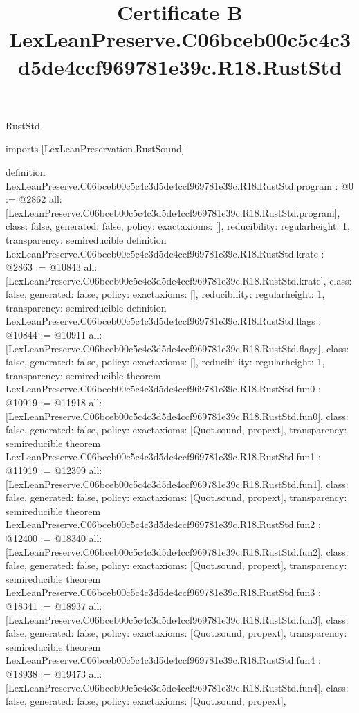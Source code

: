 \begin{lexlean}{RustStd}
\title{Certificate B LexLeanPreserve.C06bceb00c5c4c3d5de4ccf969781e39c.R18.RustStd}
\begin{coremodule}
imports [LexLeanPreservation.RustSound]

definition LexLeanPreserve.C06bceb00c5c4c3d5de4ccf969781e39c.R18.RustStd.program : @0 := @2862 {
  all: [LexLeanPreserve.C06bceb00c5c4c3d5de4ccf969781e39c.R18.RustStd.program],
  class: false,
  generated: false,
  policy: exact{axioms: []},
  reducibility: regular{height: 1},
  transparency: semireducible
}
definition LexLeanPreserve.C06bceb00c5c4c3d5de4ccf969781e39c.R18.RustStd.krate : @2863 := @10843 {
  all: [LexLeanPreserve.C06bceb00c5c4c3d5de4ccf969781e39c.R18.RustStd.krate],
  class: false,
  generated: false,
  policy: exact{axioms: []},
  reducibility: regular{height: 1},
  transparency: semireducible
}
definition LexLeanPreserve.C06bceb00c5c4c3d5de4ccf969781e39c.R18.RustStd.flags : @10844 := @10911 {
  all: [LexLeanPreserve.C06bceb00c5c4c3d5de4ccf969781e39c.R18.RustStd.flags],
  class: false,
  generated: false,
  policy: exact{axioms: []},
  reducibility: regular{height: 1},
  transparency: semireducible
}
theorem LexLeanPreserve.C06bceb00c5c4c3d5de4ccf969781e39c.R18.RustStd.fun0 : @10919 := @11918 {
  all: [LexLeanPreserve.C06bceb00c5c4c3d5de4ccf969781e39c.R18.RustStd.fun0],
  class: false,
  generated: false,
  policy: exact{axioms: [Quot.sound, propext]},
  transparency: semireducible
}
theorem LexLeanPreserve.C06bceb00c5c4c3d5de4ccf969781e39c.R18.RustStd.fun1 : @11919 := @12399 {
  all: [LexLeanPreserve.C06bceb00c5c4c3d5de4ccf969781e39c.R18.RustStd.fun1],
  class: false,
  generated: false,
  policy: exact{axioms: [Quot.sound, propext]},
  transparency: semireducible
}
theorem LexLeanPreserve.C06bceb00c5c4c3d5de4ccf969781e39c.R18.RustStd.fun2 : @12400 := @18340 {
  all: [LexLeanPreserve.C06bceb00c5c4c3d5de4ccf969781e39c.R18.RustStd.fun2],
  class: false,
  generated: false,
  policy: exact{axioms: [Quot.sound, propext]},
  transparency: semireducible
}
theorem LexLeanPreserve.C06bceb00c5c4c3d5de4ccf969781e39c.R18.RustStd.fun3 : @18341 := @18937 {
  all: [LexLeanPreserve.C06bceb00c5c4c3d5de4ccf969781e39c.R18.RustStd.fun3],
  class: false,
  generated: false,
  policy: exact{axioms: [Quot.sound, propext]},
  transparency: semireducible
}
theorem LexLeanPreserve.C06bceb00c5c4c3d5de4ccf969781e39c.R18.RustStd.fun4 : @18938 := @19473 {
  all: [LexLeanPreserve.C06bceb00c5c4c3d5de4ccf969781e39c.R18.RustStd.fun4],
  class: false,
  generated: false,
  policy: exact{axioms: [Quot.sound, propext]},
}
\end{coremodule}
\end{lexlean}
